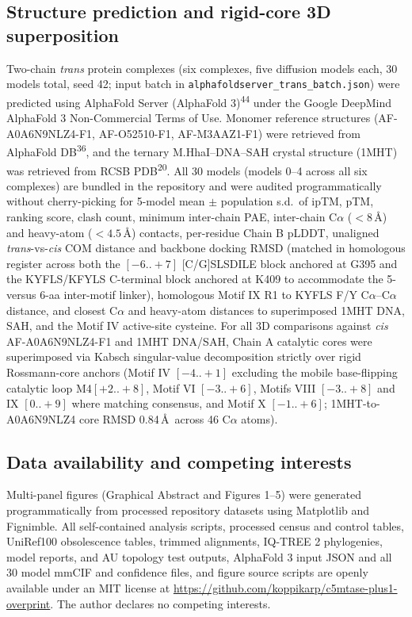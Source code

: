 \documentclass[10pt,letterpaper]{article}
\newcommand{\refsup}[1]{\textsuperscript{#1}}
\begin{document}
\subsection{Structure prediction and rigid-core 3D superposition}

Two-chain \textit{trans} protein complexes (six complexes, five diffusion models each, 30 models total, seed 42; input batch in \texttt{alphafoldserver\_trans\_batch.json}) were predicted using AlphaFold Server (AlphaFold 3)\refsup{44} under the Google DeepMind AlphaFold 3 Non-Commercial Terms of Use. Monomer reference structures (AF-A0A6N9NLZ4-F1, AF-O52510-F1, AF-M3AAZ1-F1) were retrieved from AlphaFold DB\refsup{36}, and the ternary M.HhaI--DNA--SAH crystal structure (1MHT) was retrieved from RCSB PDB\refsup{20}. All 30 models (models 0--4 across all six complexes) are bundled in the repository and were audited programmatically without cherry-picking for 5-model mean $\pm$ population s.d.\ of ipTM, pTM, ranking score, clash count, minimum inter-chain PAE, inter-chain C$\alpha$ ($< 8$\,\AA) and heavy-atom ($< 4.5$\,\AA) contacts, per-residue Chain B pLDDT, unaligned \textit{trans}-vs-\textit{cis} COM distance and backbone docking RMSD (matched in homologous register across both the $[-6..+7]$ [C/G]SLSDILE block anchored at G395 and the KYFLS/KFYLS C-terminal block anchored at K409 to accommodate the 5- versus 6-aa inter-motif linker), homologous Motif IX R1 to KYFLS F/Y C$\alpha$--C$\alpha$ distance, and closest C$\alpha$ and heavy-atom distances to superimposed 1MHT DNA, SAH, and the Motif IV active-site cysteine. For all 3D comparisons against \textit{cis} AF-A0A6N9NLZ4-F1 and 1MHT DNA/SAH, Chain A catalytic cores were superimposed via Kabsch singular-value decomposition strictly over rigid Rossmann-core anchors (Motif IV $[-4..+1]$ excluding the mobile base-flipping catalytic loop M4$[+2..+8]$, Motif VI $[-3..+6]$, Motifs VIII $[-3..+8]$ and IX $[0..+9]$ where matching consensus, and Motif X $[-1..+6]$; 1MHT-to-A0A6N9NLZ4 core RMSD 0.84\,\AA\ across 46 C$\alpha$ atoms).

\subsection{Data availability and competing interests}

Multi-panel figures (Graphical Abstract and Figures 1--5) were generated programmatically from processed repository datasets using Matplotlib and Fignimble. All self-contained analysis scripts, processed census and control tables, UniRef100 obsolescence tables, trimmed alignments, IQ-TREE 2 phylogenies, model reports, and AU topology test outputs, AlphaFold 3 input JSON and all 30 model mmCIF and confidence files, and figure source scripts are openly available under an MIT license at \url{https://github.com/koppikarp/c5mtase-plus1-overprint}. The author declares no competing interests.
\end{document}
